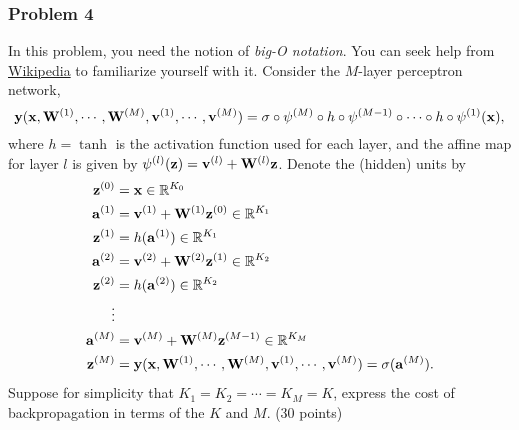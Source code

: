 \documentclass[12pt,a4paper]{article}
\renewcommand{\v}[1]{\ifmmode\mathbf{#1}\fi}
\newcommand{\ra}[1]{\ifnum #1=1\rightarrow\fi\ifnum #1=2\Rightarrow\fi\ifnum #1=3\Rrightarrow\fi\ifnum #1=4\rightrightarrows\fi\ifnum #1=5\rightleftarrows\fi\ifnum #1=6\mapsto\fi\ifnum #1=7\iffalse\fi\fi\ifnum #1=8\twoheadrightarrow\fi\ifnum #1=9\rightharpoonup\fi\ifnum #1=0\rightharpoondown\fi}
\renewcommand{\o}{\circ}
\newcommand{\R}{\ifmmode\mathbb R\fi}
\newcommand{\N}{\ifmmode\mathbb N\fi}
\begin{document}
\subsubsection*{Problem 4}
In this problem, you need the notion of \textit{big-O notation}. You can seek help from \href{https://en.wikipedia.org/wiki/Big_O_notation}{Wikipedia} to familiarize yourself with it. Consider the $M$-layer perceptron network,
\begin{equation*}
	\mathbf y(\v x, \v W^{(1)}, \cdots, \v W^{(M)}, \v v^{(1)}, \cdots, \v v^{(M)}) = \sigma \o \psi^{(M)} \o h \o \psi^{(M-1)} \o \cdots \o h \o \psi^{(1)} (\v x),
\end{equation*}
where $h = \tanh$ is the activation function used for each layer, and the affine map for layer $l$ is given by $\psi^{(l)}(\v z) = \v v^{(l)} + \v W^{(l)} \v z$.
Denote the (hidden) units by
\begin{align*}
	\mathbf z^{(0)} &= \v x \in \R^{K_0} \\
	\mathbf a^{(1)} &= \v v^{(1)} + \v W^{(1)} \v z^{(0)} \in \R^{K_1} \\
	\mathbf z^{(1)} &= h(\v a^{(1)}) \in \R^{K_1} \\
	\mathbf a^{(2)} &= \v v^{(2)} + \v W^{(2)} \v z^{(1)} \in \R^{K_2} \\
	\mathbf z^{(2)} &= h(\v a^{(2)}) \in \R^{K_2} \\
	\vdots \\
	\mathbf a^{(M)} &= \v v^{(M)} + \v W^{(M)} \v z^{(M-1)} \in \R^{K_M} \\
	\mathbf z^{(M)} & = \mathbf y(\v x, \v W^{(1)}, \cdots, \v W^{(M)}, \v v^{(1)}, \cdots, \v v^{(M)}) = \sigma(\v a^{(M)}).
\end{align*}
Suppose for simplicity that $K_1 = K_2 = \cdots = K_M = K$, express the cost of backpropagation in terms of the $K$ and $M$. (30 points)
\end{document}
